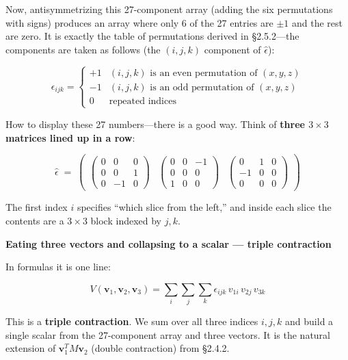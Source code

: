 Now, antisymmetrizing this 27-component array (adding the six
permutations with signs) produces an array where only 6 of the 27
entries are \(\pm 1\) and the rest are zero. It is exactly the table of
permutations derived in §2.5.2---the components are taken as follows
(the \((i,j,k)\) component of \(\widehat{\epsilon}\)):

\[
\epsilon_{ijk} = \begin{cases} +1 & (i,j,k) \text{ is an even permutation of } (x,y,z) \\ -1 & (i,j,k) \text{ is an odd permutation of } (x,y,z) \\ 0 & \text{repeated indices} \end{cases}
\]

How to display these 27 numbers---there is a good way. Think of
\textbf{three $3 \times 3$ matrices lined up in a row}:

\[
\widehat{\epsilon} \;{=}\;
\begin{pmatrix}
\begin{pmatrix} 0 & 0 & 0 \\ 0 & 0 & 1 \\ 0 & -1 & 0 \end{pmatrix} &
\begin{pmatrix} 0 & 0 & -1 \\ 0 & 0 & 0 \\ 1 & 0 & 0 \end{pmatrix} &
\begin{pmatrix} 0 & 1 & 0 \\ -1 & 0 & 0 \\ 0 & 0 & 0 \end{pmatrix}
\end{pmatrix}
\]

The first index \(i\) specifies ``which slice from the left,'' and
inside each slice the contents are a \(3 \times 3\) block indexed by
\(j,k\).

\textbf{Eating three vectors and collapsing to a scalar — triple contraction}

In formulas it is one line:

\[
V(\mathbf{v}_1, \mathbf{v}_2, \mathbf{v}_3) = \sum_i\sum_j\sum_k \epsilon_{ijk}\, v_{1i}\, v_{2j}\, v_{3k}
\]

This is a \textbf{triple contraction}. We sum over all three indices
\(i, j, k\) and build a single scalar from the 27-component array and
three vectors. It is the natural extension of
\(\mathbf{v}_1^T M \mathbf{v}_2\) (double contraction) from §2.4.2.

